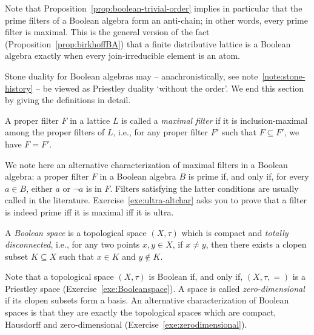 Note that Proposition~\ref{prop:boolean-trivial-order} implies in particular that the prime filters of a Boolean algebra form an anti-chain; in other words, every prime filter is maximal. This is the general version of the fact (Proposition~\ref{prop:birkhoffBA}) that a finite distributive lattice is a Boolean algebra exactly when every join-irreducible element is an atom. 

Stone duality for Boolean algebras may -- anachronistically, see note~\ref{note:stone-history} -- be viewed as Priestley duality `without the order'. We end this section by giving the definitions in detail.
\begin{definition}
  A proper filter $F$ in a lattice $L$ is called a \emph{maximal filter} if it is inclusion-maximal among the proper filters of $L$, i.e., for any proper filter $F'$ such that $F \subseteq F'$, we have $F = F'$.
\end{definition}
We note here an alternative characterization of maximal filters in a Boolean algebra: a proper filter $F$ in a Boolean algebra $B$ is prime if, and only if, for every $a \in B$, either $a$ or $\neg a$ is in $F$. Filters satisfying the latter conditions are usually called  in the literature. Exercise~\ref{exe:ultra-altchar} asks you to prove that a filter is indeed prime iff it is  maximal iff it is ultra. 

\begin{definition}
A \emph{Boolean space} is a topological space $(X,\tau)$ which is compact and \emph{totally disconnected}, i.e., for any two points $x, y \in X$, if $x \neq y$, then there exists a clopen subset $K \subseteq X$ such that $x \in K$ and $y \not\in K$.
\end{definition}
Note that a topological space $(X,\tau)$ is Boolean if, and only if, $(X,\tau,=)$ is a Priestley space (Exercise~\ref{exe:Booleanspace}). A space is called \emph{zero-dimensional} if its clopen subsets form a basis. An alternative characterization of Boolean spaces is that they are exactly the topological spaces which are compact, Hausdorff and zero-dimensional (Exercise~\ref{exe:zerodimensional}).

